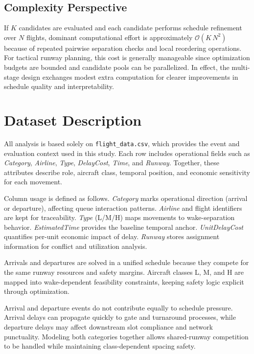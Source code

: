 \documentclass[conference]{IEEEtran}
\begin{document}
\subsection{Complexity Perspective}
If $K$ candidates are evaluated and each candidate performs schedule refinement over $N$ flights, dominant computational effort is approximately $\mathcal{O}(K\,N^2)$ because of repeated pairwise separation checks and local reordering operations. For tactical runway planning, this cost is generally manageable since optimization budgets are bounded and candidate pools can be parallelized. In effect, the multi-stage design exchanges modest extra computation for clearer improvements in schedule quality and interpretability.

\section{Dataset Description}
All analysis is based solely on \texttt{flight\_data.csv}, which provides the event and evaluation context used in this study. Each row includes operational fields such as \textit{Category}, \textit{Airline}, \textit{Type}, \textit{DelayCost}, \textit{Time}, and \textit{Runway}. Together, these attributes describe role, aircraft class, temporal position, and economic sensitivity for each movement.

Column usage is defined as follows. \textit{Category} marks operational direction (arrival or departure), affecting queue interaction patterns. \textit{Airline} and flight identifiers are kept for traceability. \textit{Type} (L/M/H) maps movements to wake-separation behavior. \textit{EstimatedTime} provides the baseline temporal anchor. \textit{UnitDelayCost} quantifies per-unit economic impact of delay. \textit{Runway} stores assignment information for conflict and utilization analysis.

Arrivals and departures are solved in a unified schedule because they compete for the same runway resources and safety margins. Aircraft classes L, M, and H are mapped into wake-dependent feasibility constraints, keeping safety logic explicit through optimization.

Arrival and departure events do not contribute equally to schedule pressure. Arrival delays can propagate quickly to gate and turnaround processes, while departure delays may affect downstream slot compliance and network punctuality. Modeling both categories together allows shared-runway competition to be handled while maintaining class-dependent spacing safety.
\end{document}
